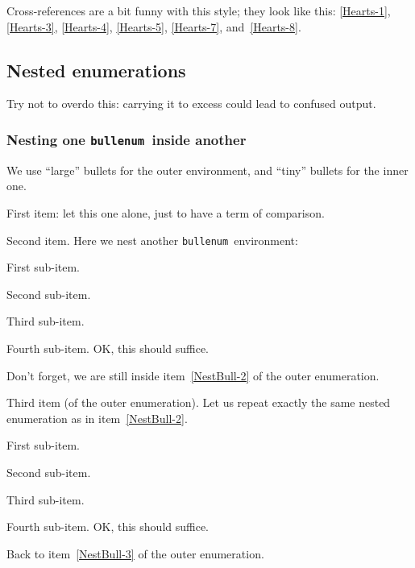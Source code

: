 \documentclass[a4paper]{article}
\DeclareRobustCommand*{\env}[1]{\texttt{#1}}
\newcommand*{\Bullenum}{bullenum}
\newcommand*{\beenv}{\env{\Bullenum}}
\begin{document}
Cross-references are a bit funny with this style; they look like this:
\ref{Hearts-1}, \ref{Hearts-3}, \ref{Hearts-4}, \ref{Hearts-5},
\ref{Hearts-7}, and~\ref{Hearts-8}.



\subsection{Nested enumerations}
\label{SS:NestXmp}

Try not to overdo this: carrying it to excess could lead to confused
output.



\subsubsection{Nesting one \beenv\ inside another}
\label{SSS:NestBullBull}

We use ``large'' bullets for the outer environment, and ``tiny''
bullets for the inner one.

\begin{bullenum}
	\largectrbull

	\item
		First item: let this one alone, just to have a term of
		comparison.

	\item\label{NestBull-2}
		Second item.  Here we nest another \beenv\ environment:
		\begin{bullenum}
			\renewcommand*{\counterlargebullet}{\textperiodcentered}
			\renewcommand*{\countersmallbullet}{\textperiodcentered}
			\item\label{NestBull-2.1}
				First sub-item.
			\item\label{NestBull-2.2}
				Second sub-item.
			\item\label{NestBull-2.3}
				Third sub-item.
			\item\label{NestBull-2.4}
				Fourth sub-item.  OK, this should suffice.
		\end{bullenum}
		Don't forget, we are still inside item~\ref{NestBull-2} of
		the outer enumeration.

	\item\label{NestBull-3}
		Third item (of the outer enumeration).  Let us repeat exactly
		the same nested enumeration as in item~\ref{NestBull-2}.
		\begin{bullenum}
			\renewcommand*{\counterlargebullet}{\textperiodcentered}
			\renewcommand*{\countersmallbullet}{\textperiodcentered}
			\item\label{NestBull-3.1}
				First sub-item.
			\item\label{NestBull-3.2}
				Second sub-item.
			\item\label{NestBull-3.3}
				Third sub-item.
			\item\label{NestBull-3.4}
				Fourth sub-item.  OK, this should suffice.
		\end{bullenum}
		Back to item~\ref{NestBull-3} of the outer enumeration.
\end{bullenum}
\end{document}
